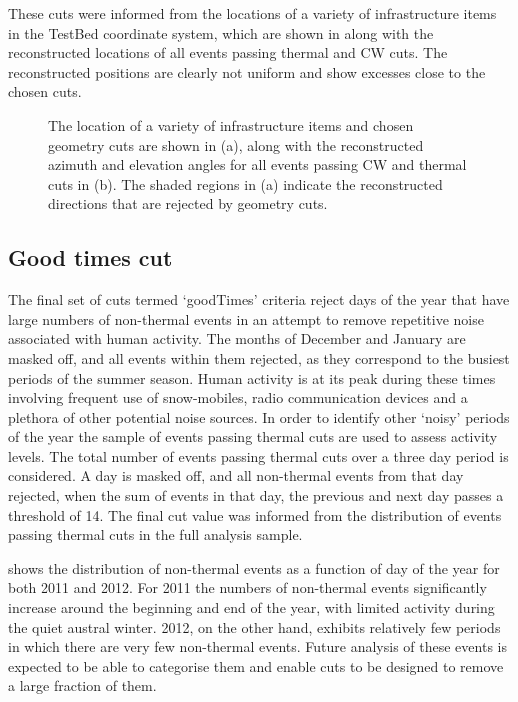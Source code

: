 These cuts were informed from the locations of a variety of infrastructure items in the TestBed coordinate system, which are shown in  along with the reconstructed locations of all events passing thermal and CW cuts. The reconstructed positions are clearly not uniform and show excesses close to the chosen cuts.

\begin{figure}[htpb]
  \hfill
  \caption{The location of a variety of infrastructure items and chosen geometry cuts are shown in (a), along with the reconstructed azimuth and elevation angles for all events passing CW and thermal cuts in (b). The shaded regions in (a) indicate the reconstructed directions that are rejected by geometry cuts.}
  \label{fig:Analysis:Anthropogenic-Cuts:Geometry-Cuts:VPol-Reco}
\end{figure}

\subsection{Good times cut}
\label{sec:Analysis:Anthropogenic-Cuts:Good-Times}
The final set of cuts termed `goodTimes' criteria reject days of the year that have large numbers of non-thermal events in an attempt to remove repetitive noise associated with human activity. The months of December and January are masked off, and all events within them rejected, as they correspond to the busiest periods of the summer season. Human activity is at its peak during these times involving frequent use of snow-mobiles, radio communication devices and a plethora of other potential noise sources. In order to identify other `noisy' periods of the year the sample of events passing thermal cuts are used to assess activity levels. The total number of events passing thermal cuts over a three day period is considered. A day is masked off, and all non-thermal events from that day rejected, when the sum of events in that day, the previous and next day passes a threshold of 14. The final cut value was informed from the distribution of events passing thermal cuts in the full analysis sample.

 shows the distribution of non-thermal events as a function of day of the year for both 2011 and 2012. For 2011 the numbers of non-thermal events significantly increase around the beginning and end of the year, with limited activity during the quiet austral winter. 2012, on the other hand, exhibits relatively few periods in which there are very few non-thermal events. Future analysis of these events is expected to be able to categorise them and enable cuts to be designed to remove a large fraction of them.

